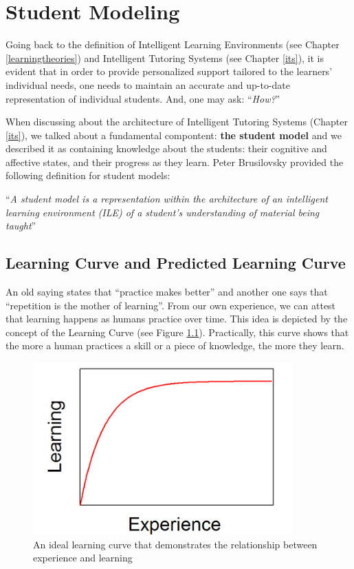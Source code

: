 \documentclass[
]{book}
\begin{document}
\chapter{Student Modeling}\label{studentmodels}

Going back to the definition of Intelligent Learning Environments (see Chapter \ref{learningtheories}) and Intelligent Tutoring Systems (see Chapter \ref{its}), it is evident that in order to provide personalized support tailored to the learners' individual needs, one needs to maintain an accurate and up-to-date representation of individual students. And, one may ask: ``\emph{How?}''

When discussing about the architecture of Intelligent Tutoring Systems (Chapter \ref{its}), we talked about a fundamental compontent: \textbf{the student model} and we described it as containing knowledge about the students: their cognitive and affective states, and their progress as they learn. Peter Brusilovsky provided the following definition for student models:

``\emph{A student model is a representation within the architecture of an intelligent learning environment (ILE) of a student's understanding of material being taught}'' \citep{brusilovsky1994student}

\section{Learning Curve and Predicted Learning Curve}\label{learning-curve-and-predicted-learning-curve}

An old saying states that ``practice makes better'' and another one says that ``repetition is the mother of learning''. From our own experience, we can attest that learning happens as humans practice over time. This idea is depicted by the concept of the Learning Curve (see Figure \ref{fig:learningcurve}). Practically, this curve shows that the more a human practices a skill or a piece of knowledge, the more they learn.

\begin{figure}
\includegraphics[width=10cm]{./images/learningcurve} \caption{An ideal learning curve that demonstrates the relationship between experience and learning}\label{fig:learningcurve}
\end{figure}
\end{document}
